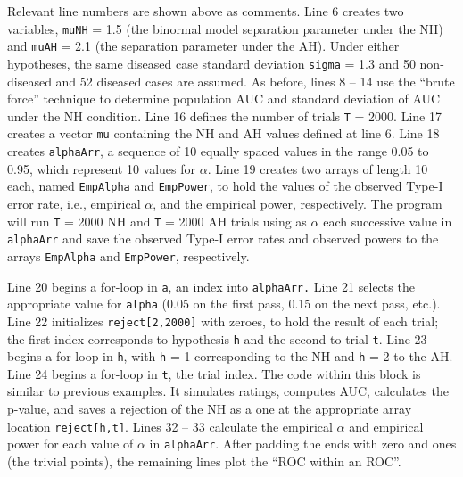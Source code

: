 \documentclass[
]{book}
\begin{document}
Relevant line numbers are shown above as comments. Line 6 creates two variables, \texttt{muNH} = 1.5 (the binormal model separation parameter under the NH) and \texttt{muAH} = 2.1 (the separation parameter under the AH). Under either hypotheses, the same diseased case standard deviation \texttt{sigma} = 1.3 and 50 non-diseased and 52 diseased cases are assumed. As before, lines 8 -- 14 use the ``brute force'' technique to determine population AUC and standard deviation of AUC under the NH condition. Line 16 defines the number of trials \texttt{T} = 2000. Line 17 creates a vector \texttt{mu} containing the NH and AH values defined at line 6. Line 18 creates \texttt{alphaArr}, a sequence of 10 equally spaced values in the range 0.05 to 0.95, which represent 10 values for \(\alpha\). Line 19 creates two arrays of length 10 each, named \texttt{EmpAlpha} and \texttt{EmpPower}, to hold the values of the observed Type-I error rate, i.e., empirical \(\alpha\), and the empirical power, respectively. The program will run \texttt{T} = 2000 NH and \texttt{T} = 2000 AH trials using as \(\alpha\) each successive value in \texttt{alphaArr} and save the observed Type-I error rates and observed powers to the arrays \texttt{EmpAlpha} and \texttt{EmpPower}, respectively.

Line 20 begins a for-loop in \texttt{a}, an index into \texttt{alphaArr.} Line 21 selects the appropriate value for \texttt{alpha} (0.05 on the first pass, 0.15 on the next pass, etc.). Line 22 initializes \texttt{reject{[}2,2000{]}} with zeroes, to hold the result of each trial; the first index corresponds to hypothesis \texttt{h} and the second to trial \texttt{t}. Line 23 begins a for-loop in \texttt{h}, with \texttt{h} = 1 corresponding to the NH and \texttt{h} = 2 to the AH. Line 24 begins a for-loop in \texttt{t}, the trial index. The code within this block is similar to previous examples. It simulates ratings, computes AUC, calculates the p-value, and saves a rejection of the NH as a one at the appropriate array location \texttt{reject{[}h,t{]}}. Lines 32 -- 33 calculate the empirical \(\alpha\) and empirical power for each value of \(\alpha\) in \texttt{alphaArr}. After padding the ends with zero and ones (the trivial points), the remaining lines plot the ``ROC within an ROC''.
\end{document}
